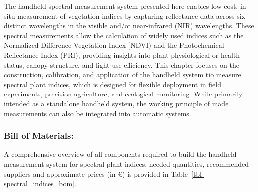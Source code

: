\documentclass[
  11pt,
  letterpaper,
]{book}
\begin{document}
The handheld spectral measurement system presented here enables
low-cost, in-situ measurement of vegetation indices by capturing
reflectance data across six distinct wavelengths in the visible and/or
near-infrared (NIR) wavelengths. These spectral measurements allow the
calculation of widely used indices such as the Normalized Difference
Vegetation Index (NDVI) and the Photochemical Reflectance Index (PRI),
providing insights into plant physiological or health status, canopy
structure, and light-use efficiency. This chapter focuses on the
construction, calibration, and application of the handheld system tio
measure spectral plant indices, which is designed for flexible
deployment in field experiments, precision agriculture, and ecological
monitoring. While primarily intended as a standalone handheld system,
the working principle of made measurements can also be integrated into
automatic systems.

\subsubsection{Bill of Materials:}\label{sec-handheld-spectral-bom}

A comprehensive overview of all components required to build the
handheld measurement system for spectral plant indices, needed
quantities, recommended suppliers and approximate prices (in €) is
provided in Table~\ref{tbl-spectral_indices_bom}.
\end{document}
